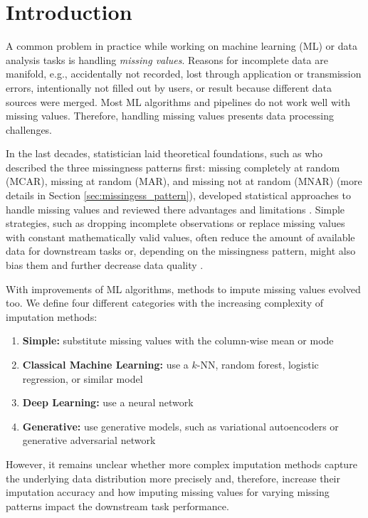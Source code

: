 \section{Introduction}
\label{sec:introduction}

A common problem in practice while working on machine learning (ML) or data analysis tasks is handling \emph{missing values}. Reasons for incomplete data are manifold, e.g., accidentally not recorded, lost through application or transmission errors, intentionally not filled out by users, or result because different data sources were merged. Most ML algorithms and pipelines do not work well with missing values. Therefore, handling missing values presents data processing challenges.

In the last decades, statistician laid theoretical foundations, such as \cite{Rubin} who described the three missingness patterns first: missing completely at random (MCAR), missing at random (MAR), and missing not at random (MNAR) (more details in Section \ref{sec:missingess_pattern}), developed statistical approaches to handle missing values and reviewed there advantages and limitations \citep{Graham}. Simple strategies, such as dropping incomplete observations or replace missing values with constant mathematically valid values, often reduce the amount of available data for downstream tasks or, depending on the missingness pattern, might also bias them and further decrease data quality \citep{Little, Graham}.

With improvements of ML algorithms, methods to impute missing values evolved too. We define four different categories with the increasing complexity of imputation methods:
%
\begin{enumerate}
	\item \textbf{Simple:} substitute missing values with the column-wise mean or mode
	\item \textbf{Classical Machine Learning:} use a $k$-NN, random forest, logistic regression, or similar model
	\item \textbf{Deep Learning:} use a neural network
	\item \textbf{Generative:} use generative models, such as variational autoencoders or generative adversarial network
\end{enumerate}
%
However, it remains unclear whether more complex imputation methods capture the underlying data distribution more precisely and, therefore, increase their imputation accuracy and how imputing missing values for varying missing patterns impact the downstream task performance.

